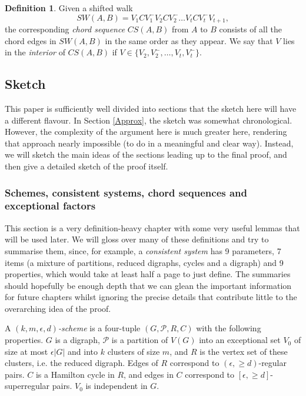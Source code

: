 \documentclass[10pt,letterpaper, reqno]{amsart}
\theoremstyle{definition}
\newtheorem{defn}[thm]{Definition}
\numberwithin{equation}{section}
\begin{document}
\begin{defn}
	Given a shifted walk 	$$ SW(A,B) = V_1CV_1^- V_2 C V_2^- \dots V_t CV_t^- V_{t+1},$$ the corresponding \textit{chord sequence} $CS(A,B)$ from $A$ to $B$ consists of all the chord edges in $SW(A,B)$ in the same order as they appear. We say that $V$ lies in the \textit{interior} of $CS(A,B)$ if $V \in \{V_2, V_2^-, \dots, V_t, V_t^-\}$.
\end{defn}

\subsection{Sketch}
This paper is sufficiently well divided into sections that the sketch here will have a different flavour. In Section \ref{Approx}, the sketch was somewhat chronological. However, the complexity of the argument here is much greater here, rendering that approach nearly impossible (to do in a meaningful and clear way). Instead, we will sketch the main ideas of the sections leading up to the final proof, and then give a detailed sketch of the proof itself. 

\subsubsection{Schemes, consistent systems, chord sequences and exceptional factors} 
This section is a very definition-heavy chapter with some very useful lemmas that will be used later. We will gloss over many of these definitions and try to summarise them, since, for example, a \textit{consistent system} has 9 parameters, 7 items (a mixture of partitions, reduced digraphs, cycles and a digraph) and 9 properties, which would take at least half a page to just define. The summaries should hopefully be enough depth that we can glean the important information for future chapters whilst ignoring the precise details that contribute little to the overarching idea of the proof. 

A $(k,m,\epsilon,d)$\textit{-scheme} is a four-tuple $(G,\mathcal{P}, R,C)$ with the following properties. $G$ is a digraph, $\mathcal{P}$ is a partition of $V(G)$ into an exceptional set $V_0$ of size at most $\epsilon|G|$ and into $k$ clusters of size $m$, and $R$ is the vertex set of these clusters, i.e. the reduced digraph. Edges of $R$ correspond to $(\epsilon, \geq d)$-regular pairs. $C$ is a Hamilton cycle in $R$, and edges in $C$ correspond to $[\epsilon,\geq d]$-superregular pairs. $V_0$ is independent in $G$. 
\end{document}
